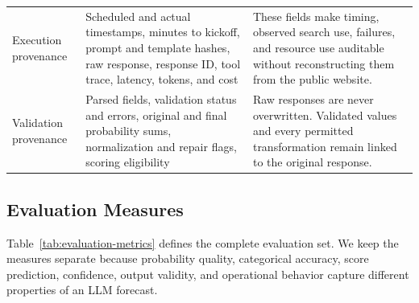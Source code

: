 \documentclass[sigconf,nonacm]{acmart}
\begin{document}
\begin{table}[t]
\begin{tabularx}{\textwidth}{>{\raggedright\arraybackslash}p{}
    >{\raggedright\arraybackslash}p{}X}
    Execution provenance &
    Scheduled and actual timestamps, minutes to kickoff, prompt and template hashes, raw response, response ID, tool trace, latency, tokens, and cost &
    These fields make timing, observed search use, failures, and resource use auditable without reconstructing them from the public website. \\

    Validation provenance &
    Parsed fields, validation status and errors, original and final probability sums, normalization and repair flags, scoring eligibility &
    Raw responses are never overwritten. Validated values and every permitted transformation remain linked to the original response. \\
    \bottomrule
  \end{tabularx}
\end{table}

\subsection{Evaluation Measures}

Table~\ref{tab:evaluation-metrics} defines the complete evaluation set. We keep the measures separate because probability quality, categorical accuracy, score prediction, confidence, output validity, and operational behavior capture different properties of an LLM forecast.
\end{document}
